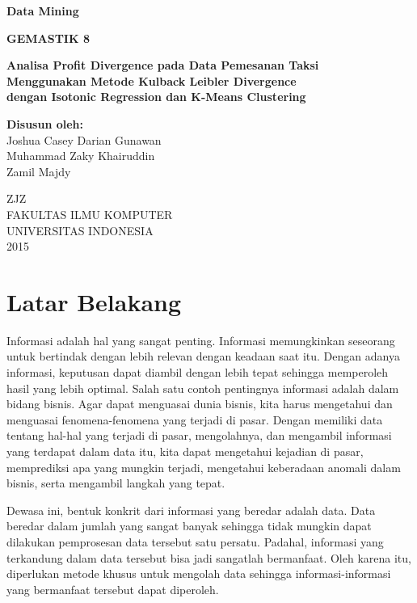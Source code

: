\documentclass{article}
\begin{document}
\begin{titlepage}

\begin{center}
	
\textbf{Data Mining}

\vspace{0.5cm}
\textbf{GEMASTIK 8}

\vspace{1.5cm}

\textbf{Analisa Profit Divergence pada Data Pemesanan Taksi\\ Menggunakan Metode Kulback Leibler Divergence\\dengan Isotonic Regression dan K-Means Clustering}

\vspace{3cm}
\textbf{Disusun oleh:}\\
Joshua Casey Darian Gunawan\\
Muhammad Zaky Khairuddin\\
Zamil Majdy
\vspace{4cm}

ZJZ\\
FAKULTAS ILMU KOMPUTER\\
UNIVERSITAS INDONESIA\\
2015
\end{center}
\end{titlepage}

\tableofcontents
\newpage

\section{Latar Belakang}

Informasi adalah hal yang sangat penting. Informasi memungkinkan seseorang untuk bertindak dengan lebih relevan dengan keadaan saat itu. Dengan adanya informasi, keputusan dapat diambil dengan lebih tepat sehingga memperoleh hasil yang lebih optimal. Salah satu contoh pentingnya informasi adalah dalam bidang bisnis. Agar dapat menguasai dunia bisnis, kita harus mengetahui dan menguasai fenomena-fenomena yang terjadi di pasar. Dengan memiliki data tentang hal-hal yang terjadi di pasar, mengolahnya, dan mengambil informasi yang terdapat dalam data itu, kita dapat mengetahui kejadian di pasar, memprediksi apa yang mungkin terjadi, mengetahui keberadaan anomali dalam bisnis, serta mengambil langkah yang tepat.

Dewasa ini, bentuk konkrit dari informasi yang beredar adalah data. Data beredar dalam jumlah yang sangat banyak sehingga tidak mungkin dapat dilakukan pemprosesan data tersebut satu persatu. Padahal, informasi yang terkandung dalam data tersebut bisa jadi sangatlah bermanfaat. Oleh karena itu, diperlukan metode khusus untuk mengolah data sehingga informasi-informasi yang bermanfaat tersebut dapat diperoleh.
\end{document}
